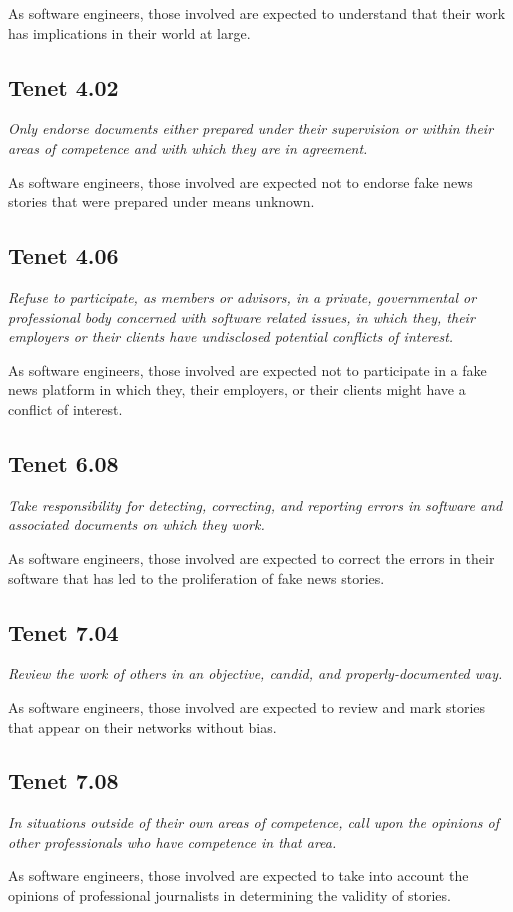 As software engineers, those involved are expected to understand that their work has implications in their world at large.

\subsection{Tenet 4.02}

\emph{Only endorse documents either prepared under their supervision or within their areas of competence and with which they are in agreement. \cite{se_code}}

As software engineers, those involved are expected not to endorse fake news stories that were prepared under means unknown.

\subsection{Tenet 4.06}

\emph{Refuse to participate, as members or advisors, in a private, governmental or professional body concerned with software related issues, in which they, their employers or their clients have undisclosed potential conflicts of interest. \cite{se_code}}

As software engineers, those involved are expected not to participate in a fake news platform in which they, their employers, or their clients might have a conflict of interest.

\subsection{Tenet 6.08}

\emph{Take responsibility for detecting, correcting, and reporting errors in software and associated documents on which they work. \cite{se_code}}

As software engineers, those involved are expected to correct the errors in their software that has led to the proliferation of fake news stories.

\subsection{Tenet 7.04}

\emph{Review the work of others in an objective, candid, and properly-documented way. \cite{se_code}}

As software engineers, those involved are expected to review and mark stories that appear on their networks without bias.

\subsection{Tenet 7.08}

\emph{In situations outside of their own areas of competence, call upon the opinions of other professionals who have competence in that area. \cite{se_code}}

As software engineers, those involved are expected to take into account the opinions of professional journalists in determining the validity of stories. 